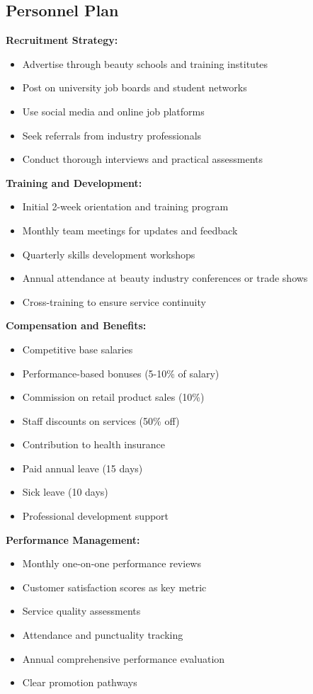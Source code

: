 \subsection{Personnel Plan}

\textbf{Recruitment Strategy:}
\begin{itemize}[leftmargin=2em]
    \item Advertise through beauty schools and training institutes
    \item Post on university job boards and student networks
    \item Use social media and online job platforms
    \item Seek referrals from industry professionals
    \item Conduct thorough interviews and practical assessments
\end{itemize}

\textbf{Training and Development:}
\begin{itemize}[leftmargin=2em]
    \item Initial 2-week orientation and training program
    \item Monthly team meetings for updates and feedback
    \item Quarterly skills development workshops
    \item Annual attendance at beauty industry conferences or trade shows
    \item Cross-training to ensure service continuity
\end{itemize}

\textbf{Compensation and Benefits:}
\begin{itemize}[leftmargin=2em]
    \item Competitive base salaries
    \item Performance-based bonuses (5-10\% of salary)
    \item Commission on retail product sales (10\%)
    \item Staff discounts on services (50\% off)
    \item Contribution to health insurance
    \item Paid annual leave (15 days)
    \item Sick leave (10 days)
    \item Professional development support
\end{itemize}

\textbf{Performance Management:}
\begin{itemize}[leftmargin=2em]
    \item Monthly one-on-one performance reviews
    \item Customer satisfaction scores as key metric
    \item Service quality assessments
    \item Attendance and punctuality tracking
    \item Annual comprehensive performance evaluation
    \item Clear promotion pathways
\end{itemize}


